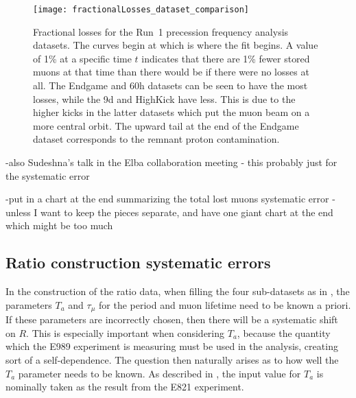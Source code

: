 \begin{figure}[]
    \centering
    \texttt{[image: fractionalLosses\_dataset\_comparison]}
    \caption[Fractional muon losses in the analyzed Run~1 datasets]{Fractional losses for the Run~1 precession frequency analysis datasets. The curves begin at  which is where the fit begins. A value of 1\% at a specific time $t$ indicates that there are 1\% fewer stored muons at that time than there would be if there were no losses at all. The Endgame and 60h datasets can be seen to have the most losses, while the 9d and HighKick have less. This is due to the higher kicks in the latter datasets which put the muon beam on a more central orbit. The upward tail at the end of the Endgame dataset corresponds to the remnant proton contamination.}
    \label{fig:fractionallosses}
\end{figure}






-also Sudeshna's talk in the Elba collaboration meeting - this probably just for the systematic error






-put in a chart at the end summarizing the total lost muons systematic error - unless I want to keep the pieces separate, and have one giant chart at the end which might be too much



\subsection{Ratio construction systematic errors}
\label{sub:TimeShiftingParameters}

In the construction of the ratio data, when filling the four sub-datasets as in , the parameters $T_{a}$ and $\tau_{\mu}$ for the \gmtwo period and muon lifetime need to be known a priori. If these parameters are incorrectly chosen, then there will be a systematic shift on $R$. This is especially important when considering $T_{a}$, because the quantity which the E989 experiment is measuring must be used in the analysis, creating sort of a self-dependence. The question then naturally arises as to how well the $T_{a}$ parameter needs to be known. As described in , the input value for $T_{a}$ is nominally taken as the result from the E821 experiment. 

